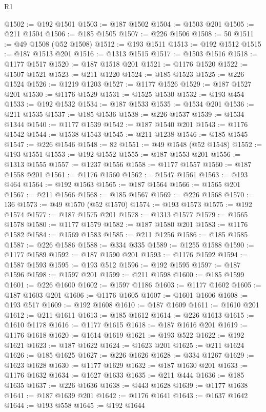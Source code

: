 \begin{lexlean}{R1}
\begin{coremodule}
@1502 := @192 @1501
@1503 := @187 @1502
@1504 := @1503 @201
@1505 := @211 @1504
@1506 := @185 @1505
@1507 := @226 @1506
@1508 := 50
@1511 := @49 @1508 (@52 @1508)
@1512 := @193 @1511
@1513 := @192 @1512
@1515 := @187 @1513 @201
@1516 := @1313 @1515
@1517 := @1503 @1516
@1518 := @1177 @1517
@1520 := @187 @1518 @201
@1521 := @1176 @1520
@1522 := @1507 @1521
@1523 := @211 @1220
@1524 := @185 @1523
@1525 := @226 @1524
@1526 := @1219 @1203
@1527 := @1177 @1526
@1529 := @187 @1527 @201
@1530 := @1176 @1529
@1531 := @1525 @1530
@1532 := @193 @454
@1533 := @192 @1532
@1534 := @187 @1533
@1535 := @1534 @201
@1536 := @211 @1535
@1537 := @185 @1536
@1538 := @226 @1537
@1539 := @1534 @1344
@1540 := @1177 @1539
@1542 := @187 @1540 @201
@1543 := @1176 @1542
@1544 := @1538 @1543
@1545 := @211 @1238
@1546 := @185 @1545
@1547 := @226 @1546
@1548 := 82
@1551 := @49 @1548 (@52 @1548)
@1552 := @193 @1551
@1553 := @192 @1552
@1555 := @187 @1553 @201
@1556 := @1313 @1555
@1557 := @1237 @1556
@1558 := @1177 @1557
@1560 := @187 @1558 @201
@1561 := @1176 @1560
@1562 := @1547 @1561
@1563 := @193 @464
@1564 := @192 @1563
@1565 := @187 @1564
@1566 := @1565 @201
@1567 := @211 @1566
@1568 := @185 @1567
@1569 := @226 @1568
@1570 := 136
@1573 := @49 @1570 (@52 @1570)
@1574 := @193 @1573
@1575 := @192 @1574
@1577 := @187 @1575 @201
@1578 := @1313 @1577
@1579 := @1565 @1578
@1580 := @1177 @1579
@1582 := @187 @1580 @201
@1583 := @1176 @1582
@1584 := @1569 @1583
@1585 := @211 @1256
@1586 := @185 @1585
@1587 := @226 @1586
@1588 := @334 @335
@1589 := @1255 @1588
@1590 := @1177 @1589
@1592 := @187 @1590 @201
@1593 := @1176 @1592
@1594 := @1587 @1593
@1595 := @193 @512
@1596 := @192 @1595
@1597 := @187 @1596
@1598 := @1597 @201
@1599 := @211 @1598
@1600 := @185 @1599
@1601 := @226 @1600
@1602 := @1597 @1186
@1603 := @1177 @1602
@1605 := @187 @1603 @201
@1606 := @1176 @1605
@1607 := @1601 @1606
@1608 := @193 @517
@1609 := @192 @1608
@1610 := @187 @1609
@1611 := @1610 @201
@1612 := @211 @1611
@1613 := @185 @1612
@1614 := @226 @1613
@1615 := @1610 @1178
@1616 := @1177 @1615
@1618 := @187 @1616 @201
@1619 := @1176 @1618
@1620 := @1614 @1619
@1621 := @193 @522
@1622 := @192 @1621
@1623 := @187 @1622
@1624 := @1623 @201
@1625 := @211 @1624
@1626 := @185 @1625
@1627 := @226 @1626
@1628 := @334 @1267
@1629 := @1623 @1628
@1630 := @1177 @1629
@1632 := @187 @1630 @201
@1633 := @1176 @1632
@1634 := @1627 @1633
@1635 := @211 @444
@1636 := @185 @1635
@1637 := @226 @1636
@1638 := @443 @1628
@1639 := @1177 @1638
@1641 := @187 @1639 @201
@1642 := @1176 @1641
@1643 := @1637 @1642
@1644 := @193 @558
@1645 := @192 @1644

\end{coremodule}
\end{lexlean}
